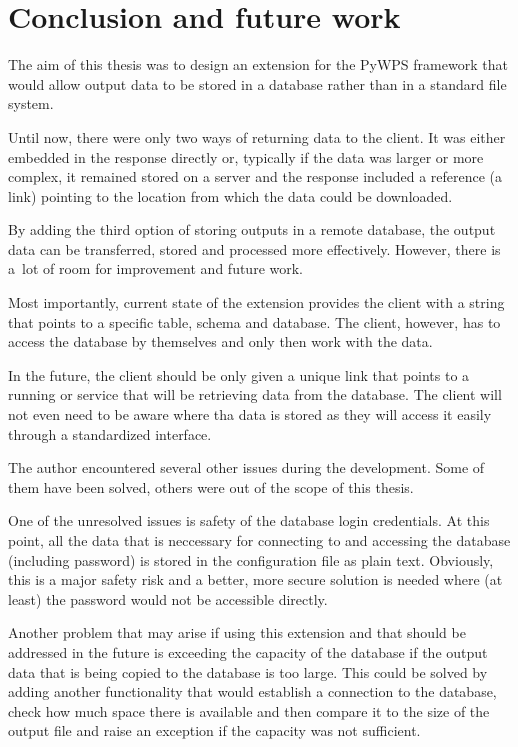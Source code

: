 \chapter{Conclusion and future work}
\label{5-conclusion}


The aim of this thesis was to design an extension for the PyWPS
framework that would allow output data to be stored in a database
rather than in a standard file system.

Until now, there were only two ways of returning data to the
client. It was either embedded in the response directly or, typically
if the data was larger or more complex, it remained stored on a server
and the response included a reference (a~ link) pointing to
the location from which the data could be downloaded.

By adding the third option of storing outputs in a remote database,
the output data can be transferred, stored and processed more
effectively. However, there is a~lot of room for improvement and
future work.

Most importantly, current state of the extension provides the client
with a string that points to a specific table, schema and
database. The client, however, has to access the database by
themselves and only then work with the data.

In the future, the client should be only given a unique  link
that points to a running  or  service that will be
retrieving data from the database. The client will not even need to be
aware where tha data is stored as they will access it easily through a
standardized interface.

The author encountered several other issues during the
development. Some of them have been solved, others were out of the
scope of this thesis.

One of the unresolved issues is safety of the database login
credentials. At this point, all the data that is neccessary for
connecting to and accessing the database (including password) is
stored in the configuration file as plain text. Obviously, this is a
major safety risk and a better, more secure solution is needed where
(at least) the password would not be accessible directly.

Another problem that may arise if using this extension and that should
be addressed in the future is exceeding the capacity of the database
if the output data that is being copied to the database is too
large. This could be solved by adding another functionality that would
establish a connection to the database, check how much space there is
available and then compare it to the size of the output file and raise
an exception if the capacity was not sufficient.

